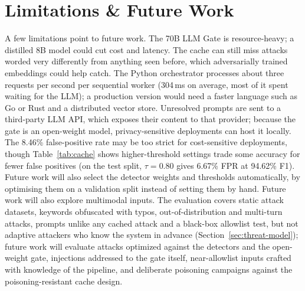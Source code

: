 \documentclass[runningheads]{llncs}
\newif\ifrev
\newcommand{\rev}[1]{\ifrev\hl{#1}\else#1\fi}                  %
\begin{document}
\section{Limitations \& Future Work}\label{sec:limitation_future}
A few limitations point to future work. The 70B LLM Gate is resource-heavy; a distilled 8B model could cut cost and latency. The cache can still miss attacks worded very differently from anything seen before, which adversarially trained embeddings could help catch. The Python orchestrator \rev{processes about three requests per second per sequential worker (304\,ms on average, most of it spent waiting for the LLM)}; a production version would need a faster language such as Go or Rust and a distributed vector store. \rev{Unresolved prompts are sent to a third-party LLM API, which exposes their content to that provider; because the gate is an open-weight model, privacy-sensitive deployments can host it locally.} The \rev{8.46\%} false-positive rate may be too strict for cost-sensitive deployments, though Table~\ref{tab:cache} shows \rev{higher-threshold} settings trade some accuracy for fewer false positives\rev{ (on the test split, $\tau=0.80$ gives 6.67\% FPR at 94.62\% F1)}. \rev{Future work will also select the detector weights and thresholds automatically, by optimising them on a validation split instead of setting them by hand.} Future work will also explore multimodal inputs\rev{. The evaluation covers static attack datasets, keywords obfuscated with typos, out-of-distribution and multi-turn attacks, prompts unlike any cached attack and a black-box allowlist test, but not adaptive attackers who know the system in advance (Section~\ref{sec:threat-model}); future work will evaluate attacks optimized against the detectors and the open-weight gate, injections addressed to the gate itself, near-allowlist inputs crafted with knowledge of the pipeline, and deliberate poisoning campaigns against the poisoning-resistant cache design}.
\end{document}
